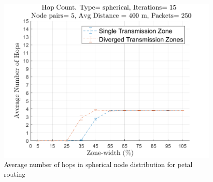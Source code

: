 \begin{figure}[hbtp]
\centering
\includegraphics[width=\simResultFigSize \textwidth,height=0.9\textheight,keepaspectratio]{ncsuthesis-0.6/Chapter-5/figs/pe_hops_spherical.png}
\caption{Average number of hops in spherical node distribution for petal routing}
\label{fig:pe_hops_spherical}
\end{figure}

